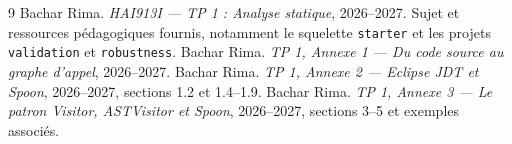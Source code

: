 \documentclass[11pt,a4paper]{article}
\newcommand{\code}[1]{\texttt{#1}}
\begin{document}
\begin{thebibliography}{9}
 Bachar Rima. \emph{HAI913I --- TP 1 : Analyse statique}, 2026--2027. Sujet et ressources pédagogiques fournis, notamment le squelette \code{starter} et les projets \code{validation} et \code{robustness}.
 Bachar Rima. \emph{TP 1, Annexe 1 --- Du code source au graphe d'appel}, 2026--2027.
 Bachar Rima. \emph{TP 1, Annexe 2 --- Eclipse JDT et Spoon}, 2026--2027, sections 1.2 et 1.4--1.9.
 Bachar Rima. \emph{TP 1, Annexe 3 --- Le patron Visitor, ASTVisitor et Spoon}, 2026--2027, sections 3--5 et exemples associés.
\end{thebibliography}
\end{document}
